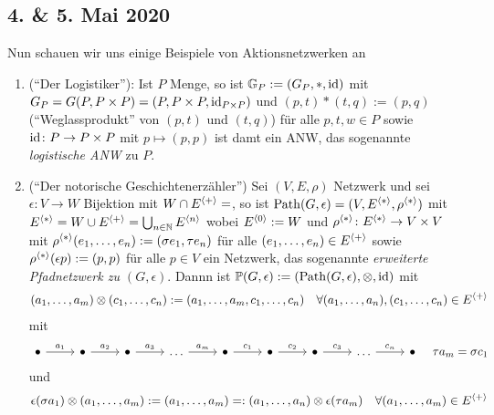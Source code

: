 \subsection*{4. \& 5. Mai 2020}
\begin{example}
Nun schauen wir uns einige Beispiele von Aktionsnetzwerken an
    \begin{enumerate}
        \item (``Der Logistiker''): Ist $P$ Menge, so ist $\mathbb{G}_P := (G_P, \ast, \operatorname{id})$ mit $G_P = G(P,P\times P) = (P, P\times P, \operatorname{id}_{P\times P})$ und $(p,t)\ast (t,q) := (p,q)$ (``Weglassprodukt'' von $(p,t)$ und $(t,q)$) für alle $p,t,w \in P$ sowie $\operatorname{id}\colon P \to P \times P$ mit $p \mapsto (p,p)$ ist damt ein ANW, das sogenannte \emph{logistische ANW} zu $P$.
        \item (``Der notorische Geschichtenerzähler'') Sei $(V,E,\rho)$ Netzwerk und sei $\epsilon \colon V \to W$ Bijektion mit $W \cap E^{\Gen{+}} = \empty$, so ist $\operatorname{Path}(G, \epsilon) = (V, E^{\langle \ast\rangle}, \rho^{\langle \ast\rangle})$ mit $ E^{\langle \ast\rangle} = W \cup E^{\langle +\rangle}= \bigcup_{n \in \mathbb{N}}E^{\langle n\rangle}$ wobei $E^{\langle 0\rangle} := W$ und $\rho^{\langle \ast\rangle} \colon E^{\langle \ast\rangle} \to V \times V$ mit $\rho^{\langle \ast\rangle}(e_1,\dots, e_n):= (\sigma e_1, \tau e_n)$ für alle $(e_1, \dots, e_n)\in E^{\langle +\rangle}$  sowie $\rho^{\langle \ast\rangle}(\epsilon p) := (p,p)$ für alle $p \in V$ ein Netzwerk, das sogenannte \emph{erweiterte Pfadnetzwerk zu $(G,\epsilon)$}. Dannn ist $\mathbb{P}(G,\epsilon) := (\operatorname{Path}(G,\epsilon), \otimes, \operatorname{id})$ mit
        \begin{align*}
            (a_1,\dots, a_m)\otimes(c_1,\dots,c_n) := (a_1, \dots, a_m, c_1, \dots, c_n) \quad \forall (a_1, \dots, a_n), (c_1, \dots, c_n) \in E^{\langle +\rangle}
        \end{align*}
        mit 
        $$
            \begin{tikzcd}
                \bullet \arrow[r, "a_1"] & \bullet \arrow[r, "a_2"] & \bullet \arrow[r, "a_3"] & \dots \arrow[r, "a_m"] & \bullet \arrow[r, "c_1"] & \bullet \arrow[r, "c_2"] & \bullet \arrow[r, "c_3"] & \dots \arrow[r, "c_n"] & \bullet
            \end{tikzcd}\quad \tau a_m = \sigma c_1
        $$
        und
        \begin{align*}
            \epsilon(\sigma a_1)\otimes (a_1, \dots, a_m):= (a_1, \dots, a_m) =: (a_1, \dots, a_n) \otimes \epsilon(\tau a_m) \quad \forall (a_1, \dots, a_m) \in E^{\Gen{+}}

\end{align*}
\end{enumerate}
\end{example}
